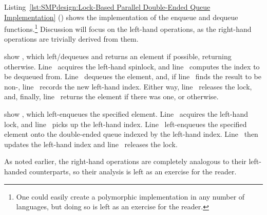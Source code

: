Listing~\ref{lst:SMPdesign:Lock-Based Parallel Double-Ended Queue Implementation}
()
shows the implementation of the enqueue and dequeue functions.\footnote{
	One could easily create a polymorphic implementation in any
	number of languages, but doing so is left as an exercise for
	the reader.}
Discussion will focus on the left-hand operations, as the right-hand
operations are trivially derived from them.

\begin{fcvref}
 show ,
which left\-/dequeues and returns
an element if possible, returning  otherwise.
Line~ acquires the left-hand spinlock,
and line~ computes the
index to be dequeued from.
Line~ dequeues the element, and,
if line~ finds the result to be
non-, line~ records the new left-hand index.
Either way, line~ releases the lock, and,
finally, line~ returns
the element if there was one, or  otherwise.
\end{fcvref}

\begin{fcvref}
 show ,
which left-enqueues the specified
element.
Line~ acquires the left-hand lock,
and line~ picks up the left-hand
index.
Line~ left-enqueues the specified element
onto the double-ended queue
indexed by the left-hand index.
Line~ then updates the left-hand index
and line~ releases the lock.
\end{fcvref}

As noted earlier, the right-hand operations are completely analogous
to their left-handed counterparts, so their analysis is left as an
exercise for the reader.

\QuickQuizEnd

